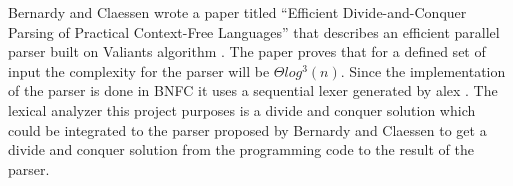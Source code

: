 Bernardy and Claessen \cite{bernardyefficient2013} wrote a paper titled 
``Efficient Divide-and-Conquer Parsing of Practical Context-Free Languages''
that describes an efficient parallel parser built on Valiants algorithm
\cite{valiantgeneral1975}. The paper proves that for a defined set of input
the complexity for the parser will be $\Theta log^3(n)$.
Since the implementation of the parser is done in BNFC \cite{bnfc} it uses a
sequential lexer generated by alex \cite{alex}. The lexical analyzer this
project purposes is a divide and conquer solution which could be integrated to
the parser proposed by Bernardy and Claessen to get a divide and conquer
solution from the programming code to the result of the parser.
